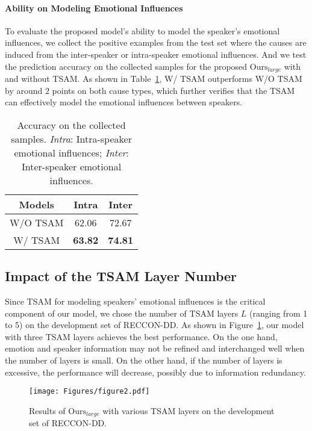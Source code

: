 \documentclass[11pt]{article}
\begin{document}
\paragraph{Ability on Modeling Emotional Influences}
To evaluate the proposed model's ability to model the speaker's emotional influences, we collect the positive examples from the test set where the causes are induced from the inter-speaker or intra-speaker emotional influences. And we test the prediction accuracy on the collected samples for the proposed $\text{Ours}_{large}$ with and without TSAM. As shown in Table~\ref{tab-6},  W/ TSAM outperforms W/O TSAM by around $2$ points on both cause types, which further verifies that the TSAM can effectively model the emotional influences between speakers.
\begin{table}[tbp]
\centering
\renewcommand\tabcolsep{8.0pt}
\begin{tabular}{c|cc}
\hline
Models & Intra & Inter \\ \hline\hline
W/O TSAM   & 62.06 & 72.67      \\
W/ TSAM  & \textbf{63.82} & \textbf{74.81}  \\ \hline
\end{tabular}
\caption{Accuracy on the collected samples. \textit{Intra}: Intra-speaker emotional influences;  \textit{Inter}: Inter-speaker emotional influences.}
\label{tab-6}
\end{table}


\subsection{Impact of the TSAM Layer Number}
Since TSAM for modeling speakers' emotional influences is the critical component of our model, we chose the number of TSAM layers $L$ (ranging from 1 to 5) on the development set of RECCON-DD. As shown in Figure~\ref{fig-3}, our model with three TSAM layers achieves the best performance. On the one hand, emotion and speaker information may not be refined and interchanged well when the number of layers is small. On the other hand, if the number of layers is excessive, the performance will decrease, possibly due to information redundancy.

\begin{figure}[htbp]
	\centering  \texttt{[image: Figures/figure2.pdf]}
\caption{Results of $\text{Ours}_{large}$ with various TSAM layers on the development set of RECCON-DD.}\label{fig-3}
\end{figure}
\end{document}
